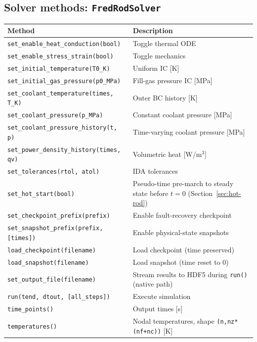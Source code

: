 \documentclass[11pt,a4paper]{article}
\begin{document}
\subsection{Solver methods: \texttt{FredRodSolver}}

\begin{center}
\begin{tabular}{ll}
\toprule
Method & Description \\
\midrule
\texttt{set\_enable\_heat\_conduction(bool)}       & Toggle thermal ODE \\
\texttt{set\_enable\_stress\_strain(bool)}         & Toggle mechanics \\
\texttt{set\_initial\_temperature(T0\_K)}          & Uniform IC [K] \\
\texttt{set\_initial\_gas\_pressure(p0\_MPa)}      & Fill-gas pressure IC [MPa] \\
\texttt{set\_coolant\_temperature(times, T\_K)}    & Outer BC history [K] \\
\texttt{set\_coolant\_pressure(p\_MPa)}            & Constant coolant pressure [MPa] \\
\texttt{set\_coolant\_pressure\_history(t, p)}     & Time-varying coolant pressure [MPa] \\
\texttt{set\_power\_density\_history(times, qv)}   & Volumetric heat [W/m$^3$] \\
\texttt{set\_tolerances(rtol, atol)}               & IDA tolerances \\
\texttt{set\_hot\_start(bool)}                     & Pseudo-time pre-march to steady state before $t=0$ (Section~\ref{sec:hot-rod}) \\
\texttt{set\_checkpoint\_prefix(prefix)}           & Enable fault-recovery checkpoint \\
\texttt{set\_snapshot\_prefix(prefix, [times])}    & Enable physical-state snapshots \\
\texttt{load\_checkpoint(filename)}                & Load checkpoint (time preserved) \\
\texttt{load\_snapshot(filename)}                  & Load snapshot (time reset to 0) \\
\texttt{set\_output\_file(filename)}               & Stream results to HDF5 during \texttt{run()} (native path) \\
\texttt{run(tend, dtout, [all\_steps])}            & Execute simulation \\
\midrule
\texttt{time\_points()}               & Output times [s] \\
\texttt{temperatures()}               & Nodal temperatures, shape \texttt{(n,nz*(nf+nc))} [K] \\

\end{tabular}
\end{center}
\end{document}
